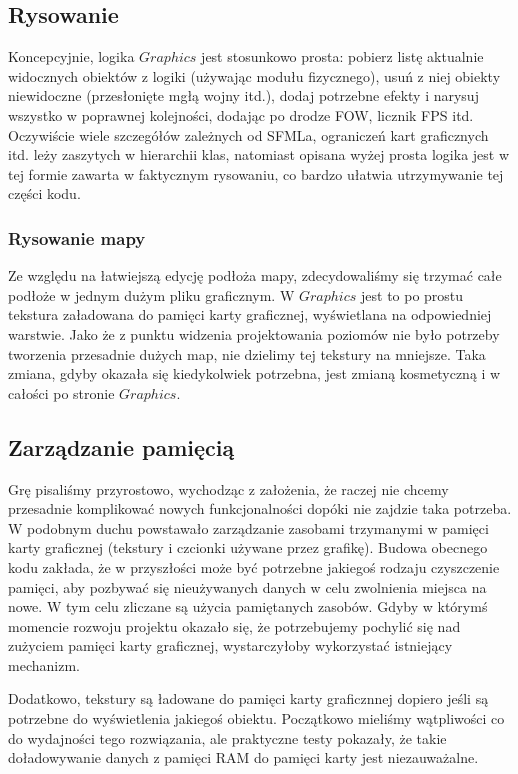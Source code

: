\documentclass[licencjacka]{pracamgr}
\begin{document}
    \subsection{Rysowanie}
      Koncepcyjnie, logika $Graphics$ jest stosunkowo prosta: pobierz listę aktualnie widocznych obiektów z logiki
      (używając modułu fizycznego), usuń z niej obiekty niewidoczne (przesłonięte mgłą wojny itd.), dodaj potrzebne
      efekty i narysuj wszystko w poprawnej kolejności, dodając po drodze FOW, licznik FPS itd. Oczywiście wiele
      szczegółów zależnych od SFMLa, ograniczeń kart graficznych itd. leży zaszytych w hierarchii klas, natomiast
      opisana wyżej prosta logika jest w tej formie zawarta w faktycznym rysowaniu, co bardzo ułatwia utrzymywanie tej
      części kodu.

    \subsubsection{Rysowanie mapy}
      Ze względu na łatwiejszą edycję podłoża mapy, zdecydowaliśmy się trzymać całe podłoże w jednym dużym pliku
      graficznym. W $Graphics$ jest to po prostu tekstura załadowana do pamięci karty graficznej, wyświetlana na
      odpowiedniej warstwie. Jako że z punktu widzenia projektowania poziomów nie było potrzeby tworzenia przesadnie
      dużych map, nie dzielimy tej tekstury na mniejsze. Taka zmiana, gdyby okazała się kiedykolwiek potrzebna,
      jest zmianą kosmetyczną i w całości po stronie $Graphics$.

    \subsection{Zarządzanie pamięcią}
      Grę pisaliśmy przyrostowo, wychodząc z założenia, że raczej nie chcemy przesadnie komplikować nowych
      funkcjonalności dopóki nie zajdzie taka potrzeba. W podobnym duchu powstawało zarządzanie zasobami trzymanymi w
      pamięci karty graficznej (tekstury i czcionki używane przez grafikę). Budowa obecnego kodu zakłada, że w
      przyszłości może być potrzebne jakiegoś rodzaju czyszczenie pamięci, aby pozbywać się nieużywanych danych w celu
      zwolnienia miejsca na nowe. W tym celu zliczane są użycia pamiętanych zasobów. Gdyby w którymś momencie rozwoju
      projektu okazało się, że potrzebujemy pochylić się nad zużyciem pamięci karty graficznej, wystarczyłoby
      wykorzystać istniejący mechanizm.

      Dodatkowo, tekstury są ładowane do pamięci karty graficznnej dopiero jeśli są potrzebne do wyświetlenia jakiegoś
      obiektu. Początkowo mieliśmy wątpliwości co do wydajności tego rozwiązania, ale praktyczne testy pokazały, że
      takie doładowywanie danych z pamięci RAM do pamięci karty jest niezauważalne.
\end{document}
